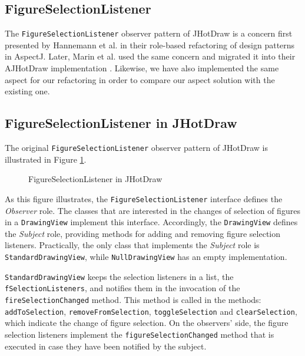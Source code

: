 \subsection{FigureSelectionListener}
The \texttt{FigureSelectionListener} observer pattern of JHotDraw is a concern first presented by Hannemann et al. \cite{hannemann2005role} in their role-based refactoring of design patterns in AspectJ. 
Later, Marin et al. used the same concern and migrated it into their AJHotDraw implementation \cite{marin2005approach}.
Likewise, we have also implemented the same aspect for our refactoring in order to compare our aspect solution with the existing one.

\subsection{FigureSelectionListener in JHotDraw}
The original \texttt{FigureSelectionListener} observer pattern of JHotDraw is illustrated in Figure \ref{fig:JHotDraw_FigureSelectionListener_OOP}.

\begin{figure}[H]
	\centering
  	\caption{FigureSelectionListener in JHotDraw}
  	\label{fig:JHotDraw_FigureSelectionListener_OOP}
\end{figure}

As this figure illustrates, the \texttt{FigureSelectionListener} interface defines the \textit{Observer} role.
The classes that are interested in the changes of selection of figures in a \texttt{DrawingView} implement this interface.
Accordingly, the \texttt{DrawingView} defines the \textit{Subject} role, providing methods for adding and removing figure selection listeners.
Practically, the only class that implements the \textit{Subject} role is \texttt{StandardDrawingView}, while \texttt{NullDrawingView} has an empty implementation.

\texttt{StandardDrawingView} keeps the selection listeners in a list, the \texttt{fSelectionListeners}, and notifies them in the invocation of the \texttt{fireSelectionChanged} method.
This method is called in the methods: \texttt{addToSelection}, \texttt{removeFromSelection}, \texttt{toggleSelection} and \texttt{clearSelection}, which indicate the change of figure selection.
On the observers' side, the figure selection listeners implement the \texttt{figureSelectionChanged} method that is executed in case they have been notified by the subject.


